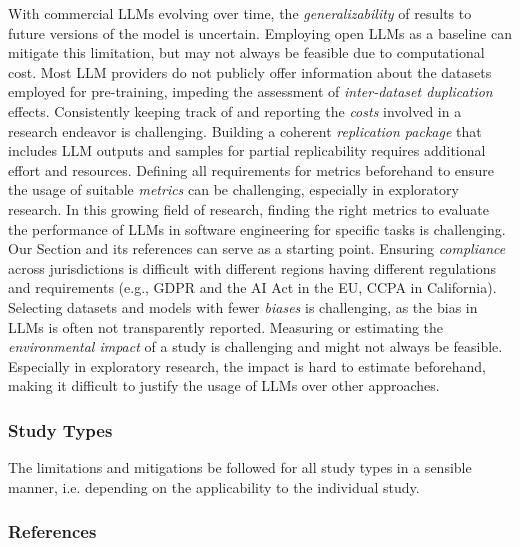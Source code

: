 With commercial LLMs evolving over time, the \emph{generalizability} of results to future versions of the model is uncertain.
Employing open LLMs as a baseline can mitigate this limitation, but may not always be feasible due to computational cost.
Most LLM providers do not publicly offer information about the datasets employed for pre-training, impeding the assessment of \emph{inter-dataset duplication} effects.
Consistently keeping track of and reporting the \emph{costs} involved in a research endeavor is challenging.
Building a coherent \emph{replication package} that includes LLM outputs and samples for partial replicability requires additional effort and resources.
Defining all requirements for metrics beforehand to ensure the usage of suitable \emph{metrics} can be challenging, especially in exploratory research.
In this growing field of research, finding the right metrics to evaluate the performance of LLMs in software engineering for specific tasks is challenging.
Our Section \benchmarksmetrics and its references can serve as a starting point.
Ensuring \emph{compliance} across jurisdictions is difficult with different regions having different regulations and requirements (e.g., GDPR and the AI Act in the EU, CCPA in California).
Selecting datasets and models with fewer \emph{biases} is challenging, as the bias in LLMs is often not transparently reported.
Measuring or estimating the \emph{environmental impact} of a study is challenging and might not always be feasible.
Especially in exploratory research, the impact is hard to estimate beforehand, making it difficult to justify the usage of LLMs over other approaches.


\subsubsection{Study Types}

The limitations and mitigations \should be followed for all study types in a sensible manner, i.e. depending on the applicability to the individual study.


\subsubsection{References}






